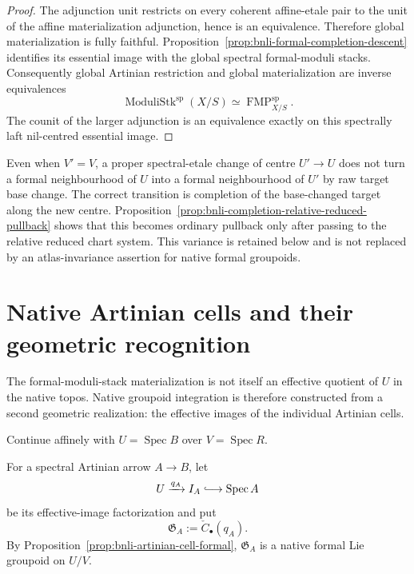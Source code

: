 \begin{proof}
The adjunction unit restricts on every coherent affine-etale pair to the unit
of the affine materialization adjunction, hence is an equivalence.  Therefore
global materialization is fully faithful.  Proposition~\ref{prop:bnli-formal-completion-descent}
identifies its essential image with the global spectral formal-moduli stacks.
Consequently global Artinian restriction and global materialization are
inverse equivalences
\[
    \operatorname{ModuliStk}^{\mathrm{sp}}(X/S)
    \simeq
    \operatorname{FMP}^{\mathrm{sp}}_{X/S}.
\]
The counit of the larger adjunction is an equivalence exactly on this
spectrally laft nil-centred essential image.
\end{proof}

\begin{remark}
Even when $V'=V$, a proper spectral-etale change of centre $U'\to U$ does not
turn a formal neighbourhood of $U$ into a formal neighbourhood of $U'$ by raw
target base change.  The correct transition is completion of the base-changed
target along the new centre.  Proposition~\ref{prop:bnli-completion-relative-reduced-pullback}
shows that this becomes ordinary pullback only after passing to the relative
reduced chart system.  This variance is retained below and is not replaced by
an atlas-invariance assertion for native formal groupoids.
\end{remark}

\section{Native Artinian cells and their geometric recognition}
\label{sec:bnli-native-cells}

The formal-moduli-stack materialization is not itself an effective quotient of
$U$ in the native topos.  Native groupoid integration is therefore constructed
from a second geometric realization: the effective images of the individual
Artinian cells.

Continue affinely with $U=\operatorname{Spec}B$ over
$V=\operatorname{Spec}R$.

\begin{definition}
\label{def:bnli-native-artinian-cell}
For a spectral Artinian arrow $A\to B$, let
\[
    U\xrightarrow{q_A}I_A\lhook\joinrel\longrightarrow\operatorname{Spec}A
\]
be its effective-image factorization and put
\[
\boxed{
    \mathfrak G_A
    :=
    \check C_\bullet(q_A).}
\]
By Proposition~\ref{prop:bnli-artinian-cell-formal},
$\mathfrak G_A$ is a native formal Lie groupoid on $U/V$.
\end{definition}

